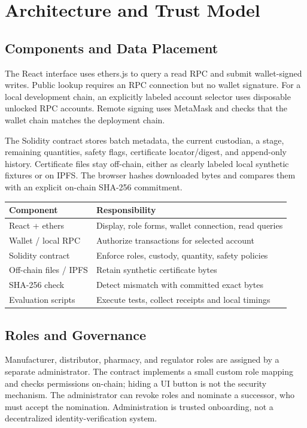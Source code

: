 \section{Architecture and Trust Model}
\subsection{Components and Data Placement}
The React interface uses ethers.js to query a read RPC and submit wallet-signed writes. Public lookup requires an RPC connection but no wallet signature. For a local development chain, an explicitly labeled account selector uses disposable unlocked RPC accounts. Remote signing uses MetaMask and checks that the wallet chain matches the deployment chain.

The Solidity contract stores batch metadata, the current custodian, a stage, remaining quantities, safety flags, certificate locator/digest, and append-only history. Certificate files stay off-chain, either as clearly labeled local synthetic fixtures or on IPFS. The browser hashes downloaded bytes and compares them with an explicit on-chain SHA-256 commitment.

\begin{center}\small
\begin{tabularx}{\columnwidth}{@{}lX@{}}\toprule
\textbf{Component} & \textbf{Responsibility}\\\midrule
React + ethers & Display, role forms, wallet connection, read queries\\
Wallet / local RPC & Authorize transactions for selected account\\
Solidity contract & Enforce roles, custody, quantity, safety policies\\
Off-chain files / IPFS & Retain synthetic certificate bytes\\
SHA-256 check & Detect mismatch with committed exact bytes\\
Evaluation scripts & Execute tests, collect receipts and local timings\\\bottomrule
\end{tabularx}\end{center}

\subsection{Roles and Governance}
Manufacturer, distributor, pharmacy, and regulator roles are assigned by a separate administrator. The contract implements a small custom role mapping and checks permissions on-chain; hiding a UI button is not the security mechanism. The administrator can revoke roles and nominate a successor, who must accept the nomination. Administration is trusted onboarding, not a decentralized identity-verification system.


